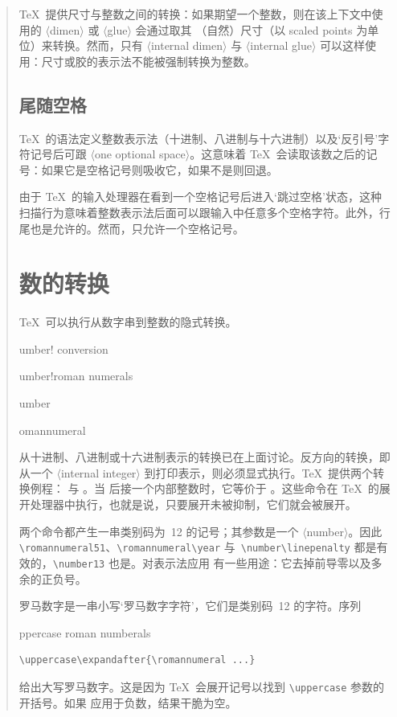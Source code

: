 \documentclass[a4paper]{rapport3}
\makeatletter
\def\gr#1{$\langle$#1$\rangle$}\def\key#1{{\tt#1}}
\newenvironment{disp}{\begin{quotation}}{\end{quotation}}
\def\term#1\par{\index{#1}}
\def\howto#1\par{}
\def\cstoidx#1\par{\index{#1@\cs{#1}}}
\makeatother
\begin{document}
\begin{disp}
\TeX\ 提供尺寸与整数之间的转换：如果期望一个整数，则在该上下文中使用的 \gr{dimen} 或 \gr{glue} 会通过取其
\awp
（自然）尺寸（以 scaled points 为单位）来转换。然而，只有 \gr{internal dimen} 与 \gr{internal glue} 可以这样使用：尺寸或胶的表示法不能被强制转换为整数。

\subsection{尾随空格}

\TeX\ 的语法定义整数表示法（十进制、八进制与十六进制）以及`反引号'字符记号后可跟 \gr{one optional space}。这意味着 \TeX\ 会读取该数之后的记号：如果它是空格记号则吸收它，如果不是则回退。

由于 \TeX\ 的输入处理器在看到一个空格记号后进入`跳过空格'状态，这种扫描行为意味着整数表示法后面可以跟输入中任意多个空格字符。此外，行尾也是允许的。然而，只允许一个空格记号。

\section{数的转换}

\TeX\ 可以执行从数字串到整数的隐式转换。
\term number! conversion\par\term number!roman numerals\par
\cstoidx number\par\cstoidx romannumeral\par
从十进制、八进制或十六进制表示的转换已在上面讨论。反方向的转换，即从一个 \gr{internal integer} 到打印表示，则必须显式执行。\TeX\ 提供两个转换例程： 与 。当  后接一个内部整数时，它等价于 。这些命令在 \TeX\ 的展开处理器中执行，也就是说，只要展开未被抑制，它们就会被展开。

两个命令都产生一串类别码为~12 的记号；其参数是一个 \gr{number}。因此 \verb-\romannumeral51-、\verb-\romannumeral\year- 与~\verb-\number\linepenalty- 都是有效的，\verb-\number13- 也是。对表示法应用  有一些用途：它去掉前导零以及多余的正负号。

罗马数字是一串小写`罗马数字字符'，它们是类别码~12 的字符。序列\howto Uppercase roman numberals\par
\begin{verbatim}
\uppercase\expandafter{\romannumeral ...}
\end{verbatim}
给出大写罗马数字。这是因为 \TeX\ 会展开记号以找到 \verb=\uppercase= 参数的开括号。如果  应用于负数，结果干脆为空。


\end{disp}
\end{document}
